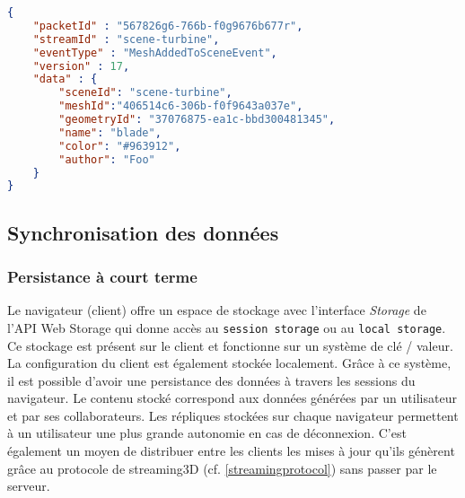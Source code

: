 \begin{lstlisting}[language=json,firstnumber=1,label=jsonstore,caption=Format
 du Message transitant sur le réseau contenant l'événement MeshAddedToScene 
et ses 
paramètres]
{
	"packetId" : "567826g6-766b-f0g9676b677r",
	"streamId" : "scene-turbine",
	"eventType" : "MeshAddedToSceneEvent",
	"version" : 17,
	"data" : {
		"sceneId": "scene-turbine",
		"meshId":"406514c6-306b-f0f9643a037e",
		"geometryId": "37076875-ea1c-bbd300481345",
		"name": "blade",
		"color": "#963912",
		"author": "Foo"
	}
}
\end{lstlisting}

\subsection{Synchronisation des données}
\subsubsection{Persistance à court terme}
Le navigateur (client) offre un espace de stockage avec l'interface \textit{Storage} 
de l'API Web Storage qui donne accès au \texttt{session storage} ou au  
\texttt{local storage}. Ce stockage est présent sur le client et fonctionne sur un système de clé / valeur. La configuration du client est également 
stockée localement. Grâce à ce système, il est possible d'avoir une 
persistance des données à travers les sessions du navigateur. Le contenu stocké 
correspond aux données générées par un utilisateur et par ses collaborateurs. Les 
répliques stockées sur chaque navigateur permettent à un utilisateur une plus 
grande 
autonomie en cas de déconnexion. C'est également un moyen de distribuer entre les clients les 
mises à jour qu'ils génèrent grâce au protocole de 
\gls{streaming3D} (cf. \ref{streamingprotocol}) sans passer par le serveur.

